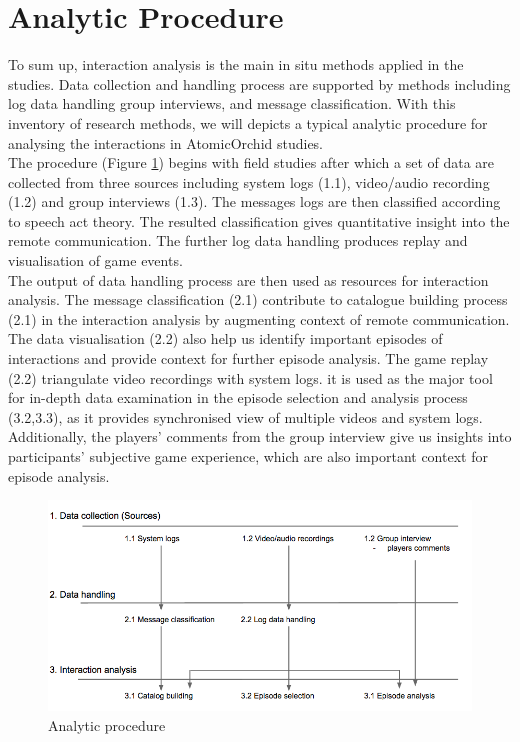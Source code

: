 \section{Analytic Procedure}
To sum up, interaction analysis is the main in situ methods applied in the studies. Data collection and handling process are supported by methods including log data handling group interviews, and message classification. With this inventory of research methods, we will depicts a typical analytic procedure for analysing the interactions in AtomicOrchid studies. \\

The procedure (Figure \ref{fig:analyticprocedure}) begins with field studies after which a set of data are collected from three sources including system logs (1.1), video/audio recording (1.2) and group interviews (1.3). The messages logs are then classified according to speech act theory. The resulted classification gives quantitative insight into the remote communication. The further log data handling produces replay and visualisation of game events. \\

The output of data handling process are then used as resources for interaction analysis. The message classification (2.1) contribute to catalogue building process (2.1) in the interaction analysis by augmenting context of remote communication. The data visualisation (2.2) also help us identify important episodes of interactions and provide context for further episode analysis. The game replay (2.2) triangulate video recordings with system logs. it is used as the major tool for in-depth data examination in the episode selection and analysis process (3.2,3.3), as it provides synchronised view of multiple videos and system logs. Additionally, the players' comments from the group interview give us insights into participants' subjective game experience, which are also important context for episode analysis.\\



\begin{figure}[h]
  \centering
  \includegraphics[width=1\textwidth]{img/methodology/analyticprocedure}
  \caption{Analytic procedure}
  \label{fig:analyticprocedure}
\end{figure}

